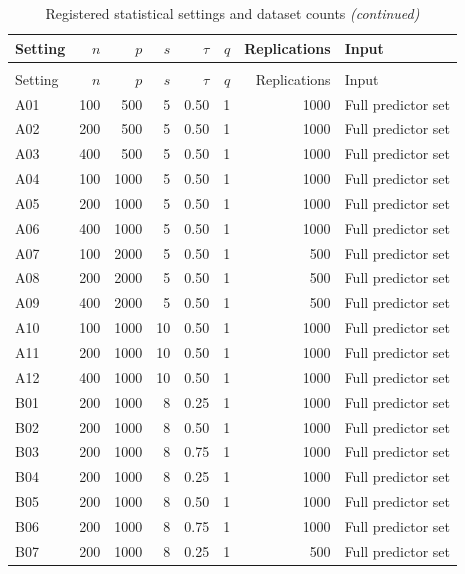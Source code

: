 
\begin{longtable}[t]{lrrrrrrl}
\caption{\label{tab:registered-study-design}Registered statistical settings and dataset counts}\\
\toprule
Setting & $n$ & $p$ & $s$ & $\tau$ & $q$ & Replications & Input\\
\midrule
\endfirsthead
\caption[]{Registered statistical settings and dataset counts \textit{(continued)}}\\
\toprule
Setting & $n$ & $p$ & $s$ & $\tau$ & $q$ & Replications & Input\\
\midrule
\endhead

\endfoot
\bottomrule
\endlastfoot
A01 & 100 & 500 & 5 & 0.50 & 1 & 1000 & Full predictor set\\
A02 & 200 & 500 & 5 & 0.50 & 1 & 1000 & Full predictor set\\
A03 & 400 & 500 & 5 & 0.50 & 1 & 1000 & Full predictor set\\
A04 & 100 & 1000 & 5 & 0.50 & 1 & 1000 & Full predictor set\\
A05 & 200 & 1000 & 5 & 0.50 & 1 & 1000 & Full predictor set\\
A06 & 400 & 1000 & 5 & 0.50 & 1 & 1000 & Full predictor set\\
A07 & 100 & 2000 & 5 & 0.50 & 1 & 500 & Full predictor set\\
A08 & 200 & 2000 & 5 & 0.50 & 1 & 500 & Full predictor set\\
A09 & 400 & 2000 & 5 & 0.50 & 1 & 500 & Full predictor set\\
A10 & 100 & 1000 & 10 & 0.50 & 1 & 1000 & Full predictor set\\
A11 & 200 & 1000 & 10 & 0.50 & 1 & 1000 & Full predictor set\\
A12 & 400 & 1000 & 10 & 0.50 & 1 & 1000 & Full predictor set\\
B01 & 200 & 1000 & 8 & 0.25 & 1 & 1000 & Full predictor set\\
B02 & 200 & 1000 & 8 & 0.50 & 1 & 1000 & Full predictor set\\
B03 & 200 & 1000 & 8 & 0.75 & 1 & 1000 & Full predictor set\\
B04 & 200 & 1000 & 8 & 0.25 & 1 & 1000 & Full predictor set\\
B05 & 200 & 1000 & 8 & 0.50 & 1 & 1000 & Full predictor set\\
B06 & 200 & 1000 & 8 & 0.75 & 1 & 1000 & Full predictor set\\
B07 & 200 & 1000 & 8 & 0.25 & 1 & 500 & Full predictor set\\

\end{longtable}
